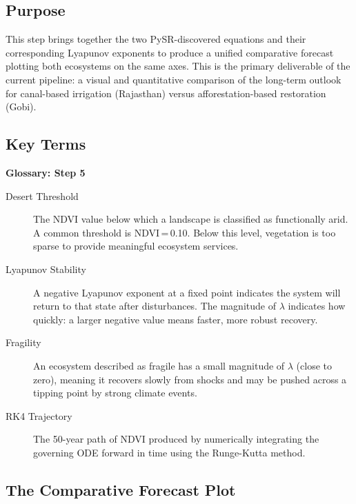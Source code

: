 \documentclass[12pt, a4paper]{article}
\begin{document}
\subsection{Purpose}

This step brings together the two PySR-discovered equations and their
corresponding Lyapunov exponents to produce a unified comparative forecast
plotting both ecosystems on the same axes. This is the primary deliverable
of the current pipeline: a visual and quantitative comparison of the
long-term outlook for canal-based irrigation (Rajasthan) versus
afforestation-based restoration (Gobi).

\subsection{Key Terms}

\begin{mdframed}[style=keybox]
\textbf{Glossary: Step 5}\\[6pt]
\begin{description}
    \item[Desert Threshold] The NDVI value below which a landscape is
    classified as functionally arid. A common threshold is NDVI\,=\,0.10.
    Below this level, vegetation is too sparse to provide meaningful
    ecosystem services.
    \item[Lyapunov Stability] A negative Lyapunov exponent at a fixed
    point indicates the system will return to that state after
    disturbances. The magnitude of $\lambda$ indicates how quickly:
    a larger negative value means faster, more robust recovery.
    \item[Fragility] An ecosystem described as fragile has a small
    magnitude of $\lambda$ (close to zero), meaning it recovers slowly
    from shocks and may be pushed across a tipping point by strong
    climate events.
    \item[RK4 Trajectory] The 50-year path of NDVI produced by
    numerically integrating the governing ODE forward in time using
    the Runge-Kutta method.
\end{description}
\end{mdframed}

\subsection{The Comparative Forecast Plot}
\end{document}
